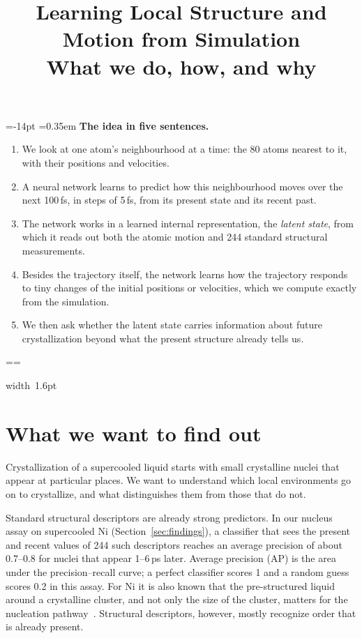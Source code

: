 \documentclass[11pt,a4paper]{article}
\title{\vspace{-1.5em}\Large\bfseries Learning Local Structure and Motion from Simulation\\[5pt]
  \large\mdseries What we do, how, and why}
\author{}\date{}
\makeatletter
\numberwithin{equation}{section}
\newcommand{\pcmWhyPiece}[1]{%
  \noindent\hbox{{\color{pcmAmber}\vrule width 1.6pt}%
    \setlength{\fboxsep}{7pt}\colorbox{pcmAmber!5}{\vbox{\unvbox#1}}}\par}
\newcommand{\pcmWhyEmit}{%
  \vbadness=10000
  \loop
    \par
    \ifdim\pagegoal=\maxdimen
      \pcmWhyAvail=\dimexpr\vsize-14pt\relax
    \else
      \pcmWhyAvail=\dimexpr\pagegoal-\pagetotal-19pt\relax
    \fi
    \ifdim\dimexpr\ht\pcmWhyAll+\dp\pcmWhyAll\relax>\pcmWhyAvail
      \ifdim\pcmWhyAvail<3\baselineskip
        \newpage
      \else
        \setbox\pcmWhyPart\vsplit\pcmWhyAll to \pcmWhyAvail
        \pcmWhyPiece\pcmWhyPart
      \fi
    \else
      \pcmWhyPiece\pcmWhyAll
    \fi
  \ifvoid\pcmWhyAll\else\repeat}
\newenvironment{why}[1][Why]{%
  \par\addvspace{.55em}%
  \setbox\pcmWhyAll\vbox\bgroup
    \hsize=\dimexpr\linewidth-1.6pt-14pt\relax
    \@parboxrestore\fussy
    \parskip=0.35em\relax
    \noindent\textcolor{pcmAmber}{\bfseries #1.}\enspace\ignorespaces}%
 {\par\egroup
  \splittopskip=\topskip\splitmaxdepth=\maxdepth
  \pcmWhyEmit
  \par\addvspace{.55em}}
\makeatother
\begin{document}
\setlength{\abovedisplayskip}{8pt plus 2pt minus 2pt}
\setlength{\belowdisplayskip}{8pt plus 2pt minus 2pt}
\setlength{\abovedisplayshortskip}{3pt plus 2pt}
\setlength{\belowdisplayshortskip}{6pt plus 2pt minus 2pt}
\maketitle\vspace{-2.6em}\thispagestyle{plain}

\begin{why}[The idea in five sentences]
\begin{enumerate}[leftmargin=1.5em]
\item We look at one atom's neighbourhood at a time: the 80 atoms nearest to it, with their
  positions and velocities.
\item A neural network learns to predict how this neighbourhood moves over the next 100\,fs, in
  steps of 5\,fs, from its present state and its recent past.
\item The network works in a learned internal representation, the \emph{latent state}, from which
  it reads out both the atomic motion and 244 standard structural measurements.
\item Besides the trajectory itself, the network learns how the trajectory responds to tiny changes
  of the initial positions or velocities, which we compute exactly from the simulation.
\item We then ask whether the latent state carries information about future crystallization beyond
  what the present structure already tells us.
\end{enumerate}
\end{why}

\section{What we want to find out}
\label{sec:question}

Crystallization of a supercooled liquid starts with small crystalline nuclei that
appear at particular places. We want to understand which local environments go
on to crystallize, and what distinguishes them from those that do not.

Standard structural descriptors are already strong predictors. In our nucleus
assay on supercooled Ni (Section~\ref{sec:findings}), a classifier that sees the
present and recent values of 244 such descriptors reaches an average precision
of about 0.7--0.8 for nuclei that appear 1--6\,ps later. Average precision (AP)
is the area under the precision--recall curve; a perfect classifier scores 1 and
a random guess scores 0.2 in this assay. For Ni it is also known that the
pre-structured liquid around a crystalline cluster, and not only the size of the
cluster, matters for the nucleation pathway~\cite{diazleines}. Structural
descriptors, however, mostly recognize order that is already present.
\end{document}
